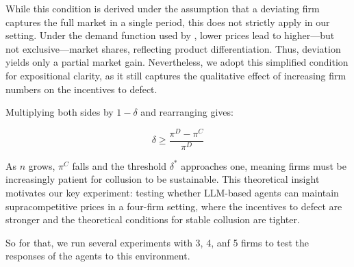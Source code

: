 While this condition is derived under the assumption that a deviating firm captures the full market in a single period, this does not strictly apply in our setting. Under the demand function used by \textcite{calvano_artificial_2020}, lower prices lead to higher—but not exclusive—market shares, reflecting product differentiation. Thus, deviation yields only a partial market gain. Nevertheless, we adopt this simplified condition for expositional clarity, as it still captures the qualitative effect of increasing firm numbers on the incentives to defect.

Multiplying both sides by $1 - \delta$ and rearranging gives:

$$\delta \geq \frac{\pi^D - \pi^C}{\pi^D}$$

As $n$ grows, $\pi^C$ falls and the threshold $\delta^*$ approaches one, meaning firms must be increasingly patient for collusion to be sustainable. This theoretical insight motivates our key experiment: testing whether LLM-based agents can maintain supracompetitive prices in a four-firm setting, where the incentives to defect are stronger and the theoretical conditions for stable collusion are tighter.


So for that, we run several experiments with 3, 4, anf 5 firms to test the responses of the agents to this environment.





